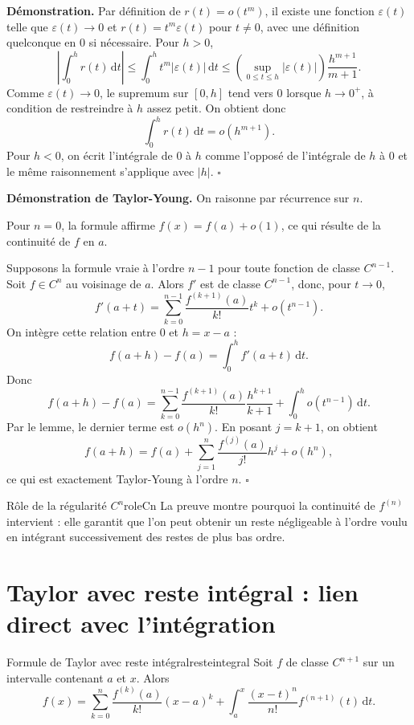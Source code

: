 \documentclass[11pt,a4paper]{article}
\newcommand{\dd}{\mathrm{d}}
\newcommand{\eps}{\varepsilon}
\begin{document}
\textbf{Démonstration.} Par définition de $r(t)=o(t^m)$, il existe une fonction $\eps(t)$ telle que $\eps(t)\to0$ et $r(t)=t^m\eps(t)$ pour $t\ne0$, avec une définition quelconque en $0$ si nécessaire. Pour $h>0$,
\[
  \left|\int_0^h r(t)\,\dd t\right|
  \le \int_0^h t^m |\eps(t)|\,\dd t
  \le \left(\sup_{0\le t\le h}|\eps(t)|\right)\frac{h^{m+1}}{m+1}.
\]
Comme $\eps(t)\to0$, le supremum sur $[0,h]$ tend vers $0$ lorsque $h\to0^+$, à condition de restreindre à $h$ assez petit. On obtient donc
\[
  \int_0^h r(t)\,\dd t=o(h^{m+1}).
\]
Pour $h<0$, on écrit l'intégrale de $0$ à $h$ comme l'opposé de l'intégrale de $h$ à $0$ et le même raisonnement s'applique avec $|h|$.
\hfill $\square$

\textbf{Démonstration de Taylor-Young.} On raisonne par récurrence sur $n$.

Pour $n=0$, la formule affirme $f(x)=f(a)+o(1)$, ce qui résulte de la continuité de $f$ en $a$.

Supposons la formule vraie à l'ordre $n-1$ pour toute fonction de classe $C^{n-1}$. Soit $f\in C^n$ au voisinage de $a$. Alors $f'$ est de classe $C^{n-1}$, donc, pour $t\to0$,
\[
  f'(a+t)=\sum_{k=0}^{n-1}\frac{f^{(k+1)}(a)}{k!}t^k+o(t^{n-1}).
\]
On intègre cette relation entre $0$ et $h=x-a$ :
\[
  f(a+h)-f(a)=\int_0^h f'(a+t)\,\dd t.
\]
Donc
\[
  f(a+h)-f(a)
  =\sum_{k=0}^{n-1}\frac{f^{(k+1)}(a)}{k!}\frac{h^{k+1}}{k+1}
  +\int_0^h o(t^{n-1})\,\dd t.
\]
Par le lemme, le dernier terme est $o(h^n)$. En posant $j=k+1$, on obtient
\[
  f(a+h)=f(a)+\sum_{j=1}^n\frac{f^{(j)}(a)}{j!}h^j+o(h^n),
\]
ce qui est exactement Taylor-Young à l'ordre $n$.
\hfill $\square$

\begin{remarkbox}{Rôle de la régularité $C^n$}{roleCn}
La preuve montre pourquoi la continuité de $f^{(n)}$ intervient : elle garantit que l'on peut obtenir un reste négligeable à l'ordre voulu en intégrant successivement des restes de plus bas ordre.
\end{remarkbox}

\section{Taylor avec reste intégral : lien direct avec l'intégration}

\begin{theorembox}{Formule de Taylor avec reste intégral}{resteintegral}
Soit $f$ de classe $C^{n+1}$ sur un intervalle contenant $a$ et $x$. Alors
\[
  f(x)=\sum_{k=0}^{n}\frac{f^{(k)}(a)}{k!}(x-a)^k
  +\int_a^x \frac{(x-t)^n}{n!}f^{(n+1)}(t)\,\dd t.
\]
\end{theorembox}
\end{document}
